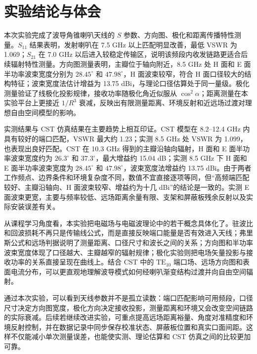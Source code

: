 \documentclass{ctexart}
\begin{document}
\section{实验结论与体会}

本次实验完成了波导角锥喇叭天线的 $S$ 参数、方向图、极化和距离传播特性测量。$S_{11}$ 结果表明，发射喇叭在 7.5 GHz 以上匹配明显改善，最低 VSWR 为 1.069；$S_{21}$ 在 7.0 GHz 以后进入较稳定传输区，说明该频段内收发链路更适合后续辐射特性测量。方向图测量表明，主瓣位于轴向附近，8.5 GHz 处 H 面和 E 面半功率波束宽度分别为 $28.45^\circ$ 和 $47.98^\circ$，H 面波束较窄，符合 H 面口径较大的结构特征；波束宽度法估计增益为 13.75 dBi，与理论口径估算处于同一量级。极化测量验证了线极化投影规律，接收功率随极化角近似服从 $\cos^2\alpha$；距离测量在本实验平台上更接近 $1/R^3$ 衰减，反映出有限测量距离、环境反射和近远场过渡对理想自由空间模型的影响。

实测结果与 CST 仿真结果在主要趋势上相互印证。CST 模型在 8.2--12.4 GHz 内具有较好的端口匹配，VSWR 最大约 1.23；实测 8.5 GHz 处 VSWR 为 1.099，也表现出良好匹配。CST 在 10.3 GHz 得到的主瓣沿轴向辐射，H 面和 E 面半功率波束宽度约为 $26.3^\circ$ 和 $37.3^\circ$，最大增益约 15.04 dB；实测 8.5 GHz 下 H 面和 E 面半功率波束宽度为 $28.45^\circ$ 和 $47.98^\circ$，波束宽度法增益约 13.75 dBi。由于两者工作频点、边界条件和环境复杂度不同，数值不宜直接逐项等同，但“高频端匹配较好、主瓣沿轴向、H 面波束较窄、增益约为十几 dBi”的结论是一致的。实测 E 面波束更宽，主要与频率较低、远场距离余量有限、支架和屏蔽板残余反射以及实际安装误差有关。

从课程学习角度看，本实验把电磁场与电磁波理论中的若干概念具体化了。驻波比和回波损耗不再只是传输线公式，而是直接反映端口能量是否有效进入天线；弗里斯公式和远场判据说明了测量距离、口径尺寸和波长之间的关系；方向图和半功率波束宽度体现了口径越大、主瓣越窄的辐射规律；极化实验则把电场矢量投影与接收功率的关系直接呈现在曲线上。结合 CST 中的 $\mathrm{TE}_{10}$ 端口场、远场方向图和表面电流分布，可以更直观地理解波导模式如何经喇叭渐变结构过渡并向自由空间辐射。

通过本次实验，可以看到天线参数并不是孤立读数：端口匹配影响可用频段，口径尺寸决定方向图宽度，极化方向决定接收投影，测量距离和环境又会改变空间链路的实际衰减。后续若继续改进实验，可重点提高远场距离裕量、角度对准精度和环境反射控制，并在数据记录中同步保存校准状态、屏蔽板位置和真实口面间距。这样不仅能减小单次测量误差，也能使实测、理论估算和 CST 仿真之间的比较更加可靠。
\end{document}
